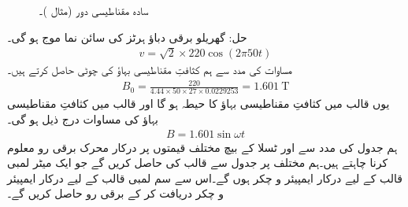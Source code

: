 \begin{figure}
\centering
{}%
\caption{سادہ مقناطیسی دور (مثال )۔}
\label{شکل_مقناطیسی__سادہ_مقناطیسی_دور_بغیر_درز_دوبارہ}
\end{figure}
حل:\quad
گھریلو برقی دباؤ  ہرٹز کی سائن نما موج ہو گی۔
\begin{align}
v=\sqrt{2} \times 220 \cos (2 \pi  50 t)
\end{align}
مساوات   کی مدد سے ہم کثافتِ مقناطیسی بہاؤ کی چوٹی حاصل کرتے ہیں۔
\begin{align}
B_0=\frac{220}{4.44 \times 50 \times 27 \times 0.0229253}=\SI{1.601}{\tesla}
\end{align}
یوں قالب میں کثافتِ مقناطیسی بہاؤ کا حیطہ    ہو گا اور   قالب میں کثافتِ مقناطیسی بہاؤ کی مساوات درج ذیل ہو گی۔
\begin{align}\label{مساوات_مقناطیسی_دور_سائن_نما_کثافت_بہاو}
B=1.601 \sin \omega t
\end{align}
ہم جدول کی مدد سے    اور  ٹسلا کے بیچ  مختلف قیمتوں پر درکار محرک برقی رو  معلوم کرنا چاہتے ہیں۔ہم مختلف  پر جدول  سے قالب کی  حاصل کریں گے جو  ایک میٹر لمبی قالب کے لیے درکار ایمپیئر و چکر ہوں گے۔اس سے  سم لمبی قالب کے لیے درکار ایمپیئر و چکر  دریافت کر کے برقی رو حاصل کریں گے۔

